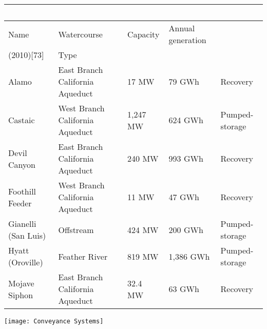 \documentclass{article}
\begin{document}
\begin{table}[!ht]
\renewcommand{\arraystretch}{2}
    \centering
    \begin{tabular}{|l|l|l|l|l|}
    \hline
          & ~ & ~ & ~ & ~ \\ \hline
        Name & Watercourse & Capacity & Annual generation  & ~ \\ \hline
        (2010)[73] & Type  & ~ & ~ & ~ \\ \hline
        Alamo & East Branch California Aqueduct & 17 MW & 79 GWh & Recovery  \\ \hline
        Castaic & West Branch California Aqueduct & 1,247 MW & 624 GWh & Pumped-storage  \\ \hline
        Devil Canyon & East Branch California Aqueduct & 240 MW & 993 GWh & Recovery  \\ \hline
        Foothill Feeder & West Branch California Aqueduct & 11 MW & 47 GWh & Recovery  \\ \hline
        Gianelli (San Luis) & Offstream & 424 MW & 200 GWh & Pumped-storage  \\ \hline
        Hyatt (Oroville) & Feather River & 819 MW & 1,386 GWh & Pumped-storage  \\ \hline
        Mojave Siphon & East Branch California Aqueduct & 32.4 MW & 63 GWh & Recovery  \\ \hline
    \end{tabular}
\end{table}

\newpage
\begin{center}
\texttt{[image: Conveyance Systems]}
\end{center}
\end{document}
